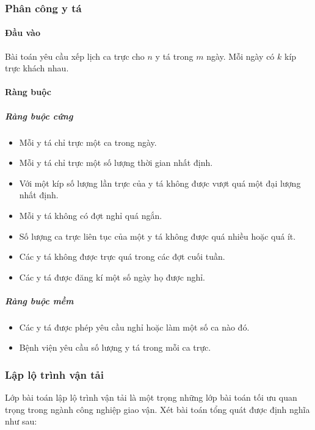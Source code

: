 \documentclass[a4paper,12pt]{report}
\begin{document}
\subsubsection{Phân công y tá}
\paragraph{Đầu vào}
Bài toán yêu cầu xếp lịch ca trực cho $n$ y tá trong $m$ ngày. Mỗi ngày có $k$ kíp trực khách nhau.  
\paragraph{Ràng buộc}
\subparagraph{Ràng buộc cứng}
\begin{itemize}
\item Mỗi y tá chỉ trực một ca trong ngày.
\item Mỗi y tá chỉ trực một số lượng thời gian nhất định.
\item Với một kíp số lượng lần trực của y tá không được vượt quá một đại lượng nhất định.
\item Mỗi y tá không có đợt nghỉ quá ngắn.
\item Số lượng ca trực liên tục của một y tá không được quá nhiều hoặc quá ít.
\item Các y tá không được trực quá trong các đợt cuối tuần.
\item Các y tá được đăng kí một số ngày họ được nghỉ.
\end{itemize}
\subparagraph{Ràng buộc mềm}
\begin{itemize}
\item Các y tá được phép yêu cầu nghỉ hoặc làm một số ca nào đó.
\item Bệnh viện yêu cầu số lượng y tá trong mỗi ca trực.
\end{itemize}

\subsubsection{Lập lộ trình vận tải}
Lớp bài toán lập lộ trình vận tải \cite{TUHTT} là một trọng những lớp bài toán tối ưu quan trọng trong ngành công nghiệp giao vận. Xét bài toán tổng quát được định nghĩa như sau:
\end{document}
